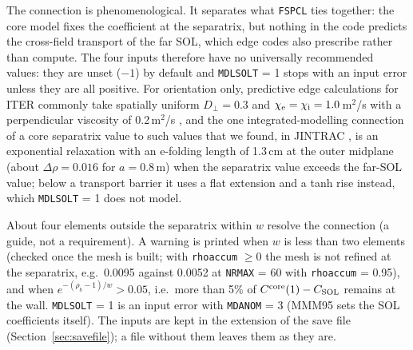\documentclass[11pt]{article}
\def\r#1{{\rm#1}}
\begin{document}
The connection is phenomenological.  It separates what \texttt{FSPCL} ties together: the
core model fixes the coefficient at the separatrix, but nothing in the code predicts the
cross-field transport of the far SOL, which edge codes also prescribe rather than compute.
The four inputs therefore have no universally
recommended values: they are unset ($-1$) by default and \texttt{MDLSOLT} = 1 stops with an
input error unless they are all positive.  For orientation only, predictive edge
calculations for ITER commonly take spatially uniform $D_\perp = 0.3$ and
$\chi_\r{e}=\chi_\r{i} = 1.0$\,m$^2$/s with a perpendicular viscosity of 0.2\,m$^2$/s
\cite{Rivals2025}, and the one integrated-modelling connection of a core separatrix value
to such values that we found, in JINTRAC \cite{Tholerus2025}, is an exponential relaxation
with an e-folding length of 1.3\,cm at the outer midplane (about $\Delta\rho = 0.016$ for
$a = 0.8$\,m) when the separatrix value exceeds the far-SOL value; below a transport barrier
it uses a flat extension and a tanh rise instead, which \texttt{MDLSOLT} = 1 does not model.

About four elements outside the separatrix within $w$ resolve the connection (a guide,
not a requirement).  A warning is printed when $w$ is less than two elements (checked
once the mesh is built; with \texttt{rhoaccum} $\ge 0$ the mesh is not refined at the
separatrix, e.g.\ 0.0095 against 0.0052 at \texttt{NRMAX} = 60 with \texttt{rhoaccum} =
0.95), and when $e^{-(\rho_b-1)/w} > 0.05$, i.e.\ more than 5\% of
$C^\r{core}(1) - C_\r{SOL}$ remains at the wall.  \texttt{MDLSOLT} = 1 is an input error
with \texttt{MDANOM} = 3 (MMM95 sets the SOL coefficients itself).  The inputs are kept in the
extension of the save file (Section~\ref{sec:savefile}); a file without them leaves them as they are.
\end{document}
